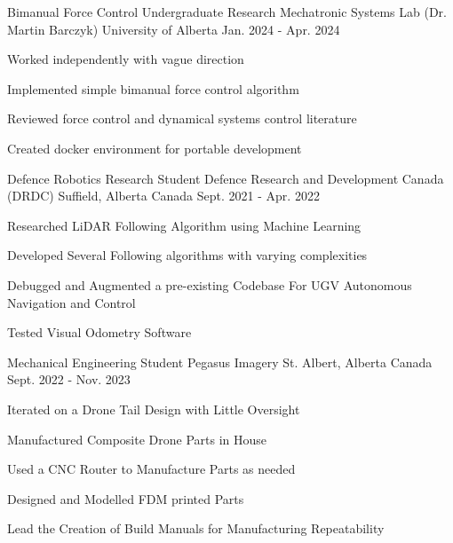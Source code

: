 

\begin{cventries}
  
\cventry
{Bimanual Force Control Undergraduate Research} %
{Mechatronic Systems Lab (Dr. Martin Barczyk)} %
{University of Alberta} %
{Jan. 2024 - Apr. 2024} %
{
  \begin{cvitems} %
    \item Worked independently with vague direction
    \item Implemented simple bimanual force control algorithm
    \item Reviewed force control and dynamical systems control literature
    \item Created docker environment for portable development
  \end{cvitems}
}

  \cventry
    {Defence Robotics Research Student} %
    {Defence Research and Development Canada (DRDC)} %
    {Suffield, Alberta Canada} %
    {Sept. 2021 - Apr. 2022} %
    {
      \begin{cvitems} %
        \item Researched LiDAR  Following Algorithm using Machine Learning
        \item Developed Several Following algorithms with varying complexities
        \item Debugged and Augmented a pre-existing Codebase For UGV Autonomous Navigation and Control
        \item Tested Visual Odometry Software
      \end{cvitems}
    }

\cventry
{Mechanical Engineering Student} %
{Pegasus Imagery} %
{St. Albert, Alberta Canada} %
{Sept. 2022 - Nov. 2023} %
{
  \begin{cvitems} %
    \item Iterated on a Drone Tail Design with Little Oversight
    \item Manufactured Composite Drone Parts in House
    \item Used a CNC Router to Manufacture Parts as needed
    \item Designed and Modelled FDM printed Parts
    \item Lead the Creation of Build Manuals for Manufacturing Repeatability
  \end{cvitems}
}


\end{cventries}
